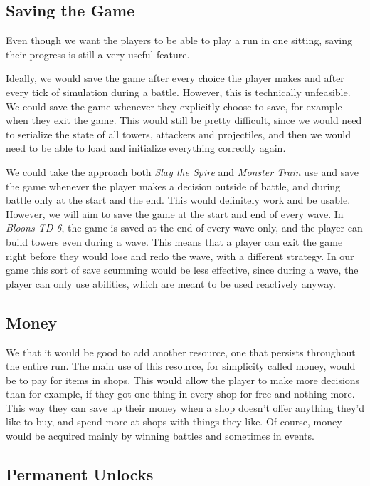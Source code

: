 \begin{notindemo}
    \subsection{Saving the Game}\label{sec:design-saving}

    Even though we want the players to be able to play a run in one sitting, saving their progress is still a very useful feature.

    Ideally, we would save the game after every choice the player makes and after every tick of simulation during a battle.
    However, this is technically unfeasible.
    We could save the game whenever they explicitly choose to save, for example when they exit the game.
    This would still be pretty difficult, since we would need to serialize the state of all towers, attackers and projectiles, and then we would need to be able to load and initialize everything correctly again.

    We could take the approach both \emph{Slay the Spire} and \emph{Monster Train} use and save the game whenever the player makes a decision outside of battle, and during battle only at the start and the end.
    This would definitely work and be usable.
    However, we will aim to save the game at the start and end of every wave.
    In \emph{Bloons TD 6}, the game is saved at the end of every wave only, and the player can build towers even during a wave.
    This means that a player can exit the game right before they would lose and redo the wave, with a different strategy.
    In our game this sort of save scumming would be less effective, since during a wave, the player can only use abilities, which are meant to be used reactively anyway.

    \subsection{Money}

    We that it would be good to add another resource, one that persists throughout the entire run.
    The main use of this resource, for simplicity called money, would be to pay for items in shops.
    This would allow the player to make more decisions than for example, if they got one thing in every shop for free and nothing more.
    This way they can save up their money when a shop doesn't offer anything they'd like to buy, and spend more at shops with things they like.
    Of course, money would be acquired mainly by winning battles and sometimes in events.

    \subsection{Permanent Unlocks}


\end{notindemo}
